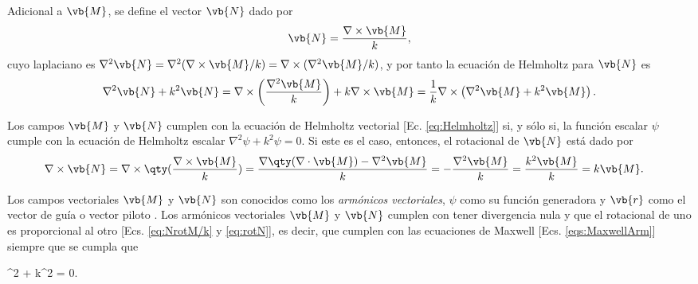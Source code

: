 Adicional a $\vb{M}$, se define el vector $\vb{N}$ dado por 
	\begin{align}
	\vb{N} = \frac{\nabla\times \vb{M}}{k}, \label{eq:NrotM/k}
	\end{align}
cuyo laplaciano es $\nabla^2 \vb{N} = \nabla^2( \nabla\times \vb{M} /k) =  \nabla\times (\nabla^2\vb{M} /k) $, y por tanto la ecuación de Helmholtz para $\vb{N}$ es
	\begin{align*}
	\nabla^2 \vb{N} + k^2 \vb{N} =  \nabla\times \left( \frac{\nabla^2 \vb{M}}{k} \right) + k \nabla\times \vb{M} 
		 = \frac{1}{k} \nabla\times \left( \nabla^2 \vb{M} + k^2  \vb{M} \right).
	\end{align*}
	
Los campos $\vb{M}$ y $\vb{N}$ cumplen con la  ecuación de Helmholtz vectorial [Ec. \eqref{eq:Helmholtz}] si, y sólo si, la función escalar $\psi$ cumple con la ecuación de Helmholtz escalar $\nabla^2 \psi + k^2 \psi = 0$. Si este es el caso, entonces, el rotacional de $\vb{N}$ está dado por
	\begin{align}
	\nabla\times \vb{N} &= \nabla\times \qty(\frac{\nabla\times \vb{M}}{k})  
						= \frac{\nabla\qty(\nabla\cdot\vb{M})-\nabla^2\vb{M}}{k}
						= - \frac{\nabla^2 \vb{M}}{k}
						= \frac{k^2 \vb{M}}{k}
						= k \vb{M}.\label{eq:rotN}
	\end{align}
	
Los campos vectoriales $\vb{M}$ y $\vb{N}$ son conocidos como los \emph{armónicos  vectoriales}, $\psi$ como su función generadora y $\vb{r}$ como el vector de guía o vector piloto \cite{bohren1998absorption}. Los armónicos vectoriales $\vb{M}$ y $\vb{N}$  cumplen con tener divergencia nula y que el rotacional de uno es proporcional al otro [Ecs. \eqref{eq:NrotM/k} y \eqref{eq:rotN}], es decir, que cumplen con las ecuaciones de Maxwell [Ecs. \eqref{eqs:MaxwellArm}] siempre que se cumpla que\vspace*{-.75em}
	\begin{tcolorbox}[title = $\mathbf{\psi}$: Función generadora de los armónicos  vectoriales, ams align ]
	\nabla^2 \psi + k^2 \psi  = 0.\label{eq:AV_psi}
	\end{tcolorbox}

